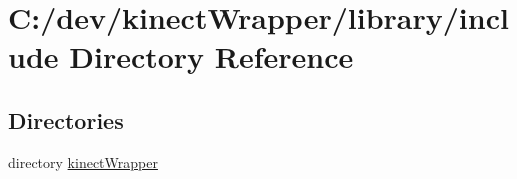 \section{C\+:/dev/kinect\+Wrapper/library/include Directory Reference}
\label{dir_9bb0cdb2fc6936e925cffa69d90b0c80}
\subsection*{Directories}
\begin{DoxyCompactItemize}
\item 
directory \hyperlink{dir_1caf105552615038a067a5e0b3628349}{kinect\+Wrapper}
\end{DoxyCompactItemize}
